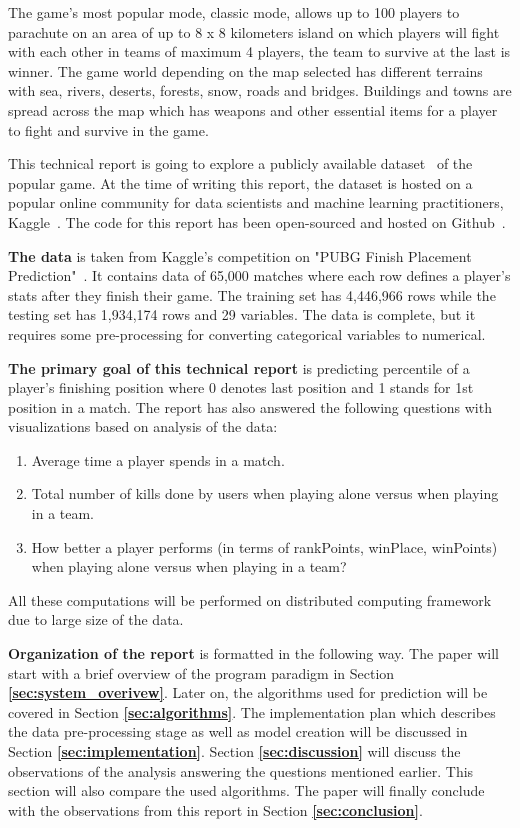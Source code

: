 \documentclass[journal,twoside,web]{ieeecolor}
\begin{document}
The game's most popular mode, classic mode, allows up to 100 players to parachute on an area of up to 8 x 8 kilometers island on which players will fight with each other in teams of maximum 4 players, the team to survive at the last is winner. The game world depending on the map selected has different terrains with sea, rivers, deserts, forests, snow, roads and bridges. Buildings and towns are spread across the map which has weapons and other essential items for a player to fight and survive in the game.

This technical report is going to explore a publicly available dataset~\cite{noauthor_pubg_nodate} of the popular game. At the time of writing this report, the dataset is hosted on a popular online community for data scientists and machine learning practitioners, Kaggle~\cite{noauthor_kaggle_nodate}. The code for this report has been open-sourced and hosted on Github~\cite{khan_faisal3325/pubg_prediction_2020}.

\textbf{The data} is taken from Kaggle's competition on "PUBG Finish Placement Prediction"~\cite{noauthor_pubg_nodate}. It contains data of 65,000 matches where each row defines a player's stats after they finish their game. The training set has 4,446,966 rows while the testing set has 1,934,174 rows and 29 variables. The data is complete, but it requires some pre-processing for converting categorical variables to numerical.

\textbf{The primary goal of this technical report} is predicting percentile of a player's finishing position where 0 denotes last position and 1 stands for 1st position in a match. The report has also answered the following questions with visualizations based on analysis of the data:
\begin{enumerate}
    \item Average time a player spends in a match.
    \item Total number of kills done by users when playing alone versus when playing in a team.
    \item How better a player performs (in terms of rankPoints, winPlace, winPoints) when playing alone versus when playing in a team?
\end{enumerate}
All these computations will be performed on distributed computing framework due to large size of the data.

\textbf{Organization of the report} is formatted in the following way. The paper will start with a brief overview of the program paradigm in Section \textbf{\ref{sec:system_overivew}}. Later on, the algorithms used for prediction will be covered in Section \textbf{\ref{sec:algorithms}}. The implementation plan which describes the data pre-processing stage as well as model creation will be discussed in Section \textbf{\ref{sec:implementation}}. Section \textbf{\ref{sec:discussion}} will discuss the observations of the analysis answering the questions mentioned earlier. This section will also compare the used algorithms. The paper will finally conclude with the observations from this report in Section \textbf{\ref{sec:conclusion}}.
\end{document}

